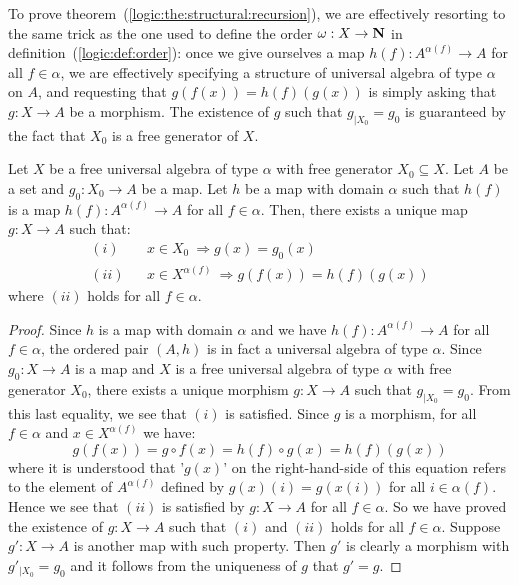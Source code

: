 To prove theorem~(\ref{logic:the:structural:recursion}), we are
effectively resorting to the same trick as the one used to define
the order $\mbox{$\omega$}:X\to\mbox{$\bf N$}$ in definition~(\ref{logic:def:order}): once
we give ourselves a map $h(f):A^{\alpha(f)}\to A$ for all
$f\in\alpha$, we are effectively specifying a structure of universal
algebra of type $\alpha$ on $A$, and requesting that
$g(f(x))=h(f)(g(x))$ is simply asking that $g:X\to A$ be a morphism.
The existence of $g$ such that $g_{|X_{0}}=g_{0}$ is guaranteed by
the fact that $X_{0}$ is a free generator of $X$.
\begin{theorem}\label{logic:the:structural:recursion}
Let $X$ be a free universal algebra of type $\alpha$  with free
generator $X_{0}\subseteq X$. Let $A$ be a set and $g_{0}:X_{0}\to
A$ be a map. Let $h$ be a map with domain $\alpha$ such that $h(f)$
is a map $h(f):A^{\alpha(f)}\to A$ for all $f\in\alpha$. Then, there
exists a unique map $g:X\to A$ such that:
    \begin{eqnarray*}
    (i)&& x\in X_{0}\ \Rightarrow g(x)=g_{0}(x)\\
    (ii)&& x\in X^{\alpha(f)}\ \Rightarrow g(f(x)) = h(f)(g(x))
    \end{eqnarray*}
where $(ii)$ holds for all $f\in\alpha$.
\end{theorem}
\begin{proof}
Since $h$ is a map with domain $\alpha$ and we have
$h(f):A^{\alpha(f)}\to A$ for all $f\in\alpha$, the ordered pair
$(A,h)$ is in fact a universal algebra of type $\alpha$. Since
$g_{0}:X\to A$ is a map and $X$ is a free universal algebra of type
$\alpha$ with free generator $X_{0}$, there exists a unique morphism
$g:X\to A$ such that $g_{|X_{0}}=g_{0}$. From this last equality, we
see that $(i)$ is satisfied. Since $g$ is a morphism, for all
$f\in\alpha$ and $x\in X^{\alpha(f)}$ we have:
    \[
    g(f(x))=g\circ f(x)=h(f)\circ g(x)=h(f)(g(x))
    \]
where it is understood that '$g(x)$' on the right-hand-side of this
equation refers to the element of $A^{\alpha(f)}$ defined by
$g(x)(i)=g(x(i))$ for all $i\in\alpha(f)$. Hence we see that $(ii)$
is satisfied by $g:X\to A$ for all $f\in\alpha$. So we have proved
the existence of $g:X\to A$ such that $(i)$ and $(ii)$ holds for all
$f\in\alpha$. Suppose $g':X\to A$ is another map with such property.
Then $g'$ is clearly a morphism with $g'_{|X_{0}}=g_{0}$ and it
follows from the uniqueness of $g$ that $g'=g$.
\end{proof}

